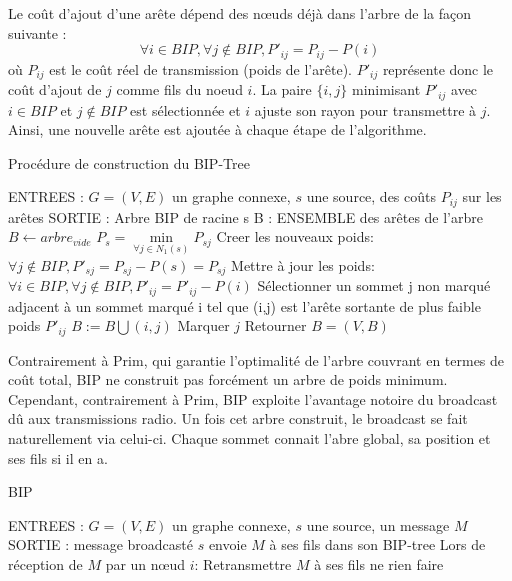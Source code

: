 Le coût d'ajout d'une arête dépend des nœuds déjà dans l'arbre de la façon suivante : 
$$ \forall i \in BIP, \forall j \notin BIP, P'_{ij}=P_{ij}-P(i)$$
où $P_{ij}$ est le coût réel de transmission (poids de l'arête). $P'_{ij}$ représente donc le coût d'ajout de $j$ comme fils du noeud $i$. La paire $\{i,j\}$ minimisant $P'_{ij}$ avec $i \in BIP$ et $j \not\in BIP$ est sélectionnée et $i$ ajuste son rayon pour transmettre à $j$. Ainsi, une nouvelle arête est ajoutée à chaque étape de l'algorithme.\\


\begin{algorithm}[h]
\caption{Procédure de construction du BIP-Tree}
\label{algo_BIP_tree}
\begin{algorithmic}
\STATE ENTREES :  $G=(V,E)$ un graphe connexe, $s$ une source, des coûts $P_{ij}$ sur les arêtes 
\STATE SORTIE : Arbre BIP de racine s
\STATE B : ENSEMBLE des arêtes de l'arbre
\STATE  $B \leftarrow arbre_{vide}$
\STATE $P_s = \min \limits_{\forall j \in N_1(s)}{P_{sj}}$
\STATE Creer les nouveaux poids: $\forall j \notin BIP, P'_{sj}=P_{sj}-P(s)=P_{sj}$
   \STATE Mettre à jour les poids:  $ \forall i \in BIP, \forall j \notin BIP, P'_{ij}=P'_{ij}-P(i)$
   \STATE Sélectionner un sommet j non marqué adjacent à un sommet marqué i tel que (i,j) est l'arête sortante de plus faible poids $P'_{ij}$
   \STATE $B := B\bigcup   {(i,j)}$
   \STATE Marquer $j$
\ENDWHILE
\STATE Retourner $B=(V,B)$
\end{algorithmic}
\end{algorithm}

Contrairement à Prim, qui garantie l'optimalité de l'arbre couvrant en termes de coût total,
BIP ne construit pas forcément un arbre de poids minimum. Cependant, contrairement à Prim, 
BIP exploite l'avantage notoire du broadcast dû aux transmissions radio. Un fois cet arbre 
construit, le broadcast se fait naturellement via celui-ci. Chaque sommet connait l'abre global,
sa position et ses fils si il en a.




\begin{algorithm}[h]
\caption{BIP}
\label{algo_BIP}
\begin{algorithmic}
\STATE ENTREES :  $G=(V,E)$ un graphe connexe, $s$ une source, un message $M$
\STATE SORTIE : message broadcasté
\STATE $s$ envoie $M$ à ses fils dans son BIP-tree
\STATE Lors de réception de $M$ par un nœud $i$:
	\STATE Retransmettre $M$ à ses fils
\ELSE
	\STATE ne rien faire
\ENDIF
\end{algorithmic}
\end{algorithm}

